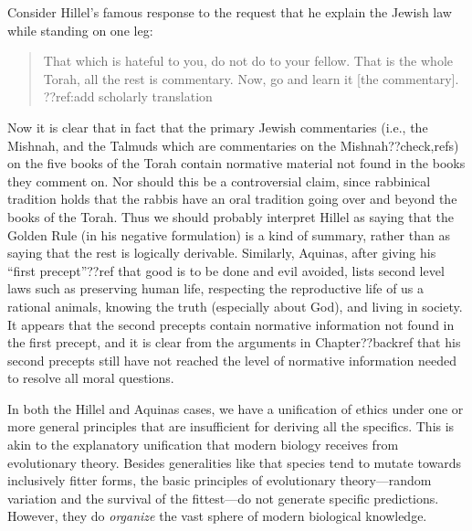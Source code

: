 Consider Hillel's famous response to the request that he explain the Jewish law while standing on one leg: 
\begin{quote}
That which is hateful to you, do not do to your fellow. That is the whole Torah, all the rest is commentary. Now, go and learn it [the commentary].
??ref:add scholarly translation
\end{quote}
Now it is clear that in fact that the primary Jewish commentaries (i.e., the Mishnah, and the
Talmuds which are commentaries on the Mishnah??check,refs) on the five books of the Torah  contain normative material not found in the books they comment on. Nor should this be 
a controversial claim, since rabbinical tradition holds that the rabbis have an oral tradition going over and beyond the books of 
the Torah. Thus we should probably interpret Hillel as saying that the Golden Rule (in his negative formulation) is a kind of summary,
rather than as saying that the rest is logically derivable. Similarly, Aquinas, after giving his ``first precept''??ref that good is to be done and evil avoided, lists second level laws such as
preserving human life, respecting the reproductive life of us a rational animals, knowing the truth (especially about God), and living 
in society. It appears that the second precepts contain normative information not found in the first precept, and
it is clear from the arguments in Chapter??backref that his second precepts still have not reached the level of 
normative information needed to resolve all moral questions.

In both the Hillel and Aquinas cases, we have a unification of ethics under one or more general principles that are insufficient
for deriving all the specifics. This is akin to the explanatory unification that modern biology receives from evolutionary theory. 
Besides generalities like that species tend to mutate towards inclusively fitter forms, the basic principles of evolutionary theory---random 
variation and the survival of the fittest---do not generate specific predictions. However, they do \textit{organize} the vast sphere of modern
biological knowledge. 

